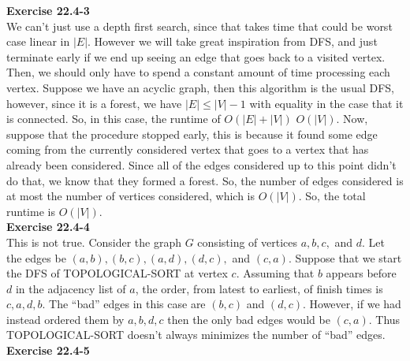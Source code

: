 \documentclass{article}
\begin{document}
\noindent\textbf{Exercise 22.4-3}\\

We can't just use a depth first search, since that takes time that could be worst case linear in $|E|$. However we will take great inspiration from DFS, and just terminate early if we end up seeing an edge that goes back to a visited vertex. Then, we should only have to spend a constant amount of time processing each vertex. Suppose we have an acyclic graph, then this algorithm is the usual DFS, however, since it is a forest, we have $|E| \le |V|-1$ with equality in the case that it is connected. So, in this case, the runtime of $O(|E|+|V|)$ $O(|V|)$. Now, suppose that the procedure stopped early, this is because it found some edge coming from the currently considered vertex that goes to a vertex that has already been considered. Since all of the edges considered up to this point didn't do that, we know that they formed a forest. So, the number of edges considered is at most the number of vertices considered, which is $O(|V|)$. So, the total runtime is $O(|V|)$.\\

\noindent\textbf{Exercise 22.4-4}\\

This is not true.  Consider the graph $G$ consisting of vertices $a, b, c, $ and $d$.  Let the edges be $(a,b), (b,c), (a,d), (d,c),$ and $(c,a)$.  Suppose that we start the DFS of TOPOLOGICAL-SORT at vertex $c$.  Assuming that $b$ appears before $d$ in the adjacency list of $a$, the order, from latest to earliest, of finish times is $c, a, d, b$. The ``bad'' edges in this case are $(b,c)$ and $(d,c)$.  However, if we had instead ordered them by $a,b,d,c$ then the only bad edges would be $(c,a)$.  Thus TOPOLOGICAL-SORT doesn't always minimizes the number of ``bad'' edges. \\

\noindent\textbf{Exercise 22.4-5}\\
\end{document}
